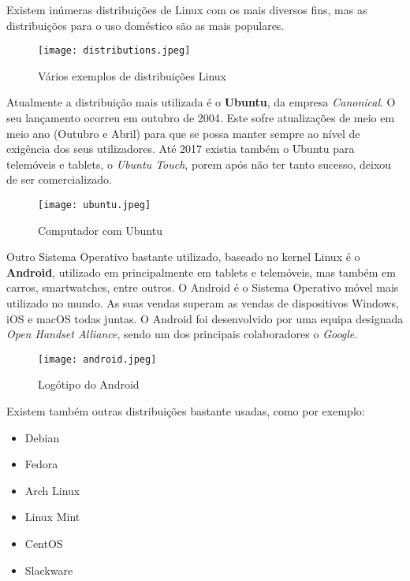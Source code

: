 \documentclass{report}
\begin{document}
\vspace{5mm}

Existem inúmeras distribuições de Linux com os mais diversos fins, mas as distribuições para o uso doméstico são as mais populares.

\begin{figure}[h!]
    \centering
    \texttt{[image: distributions.jpeg]}
    \caption{Vários exemplos de distribuições Linux}
\end{figure}

Atualmente a distribuição mais utilizada é o \textbf{Ubuntu}, da empresa \textit{Canonical}. O seu lançamento ocorreu em outubro de 2004. Este sofre atualizações de meio em meio ano (Outubro e Abril) para que se possa manter sempre ao nível de exigência dos seus utilizadores.
Até 2017 existia também o Ubuntu para telemóveis e tablets, o \textit{Ubuntu Touch}, porem após não ter tanto sucesso, deixou de ser comercializado. 

\begin{figure}[h!]
    \centering
    \texttt{[image: ubuntu.jpeg]}
    \caption{Computador com Ubuntu}
\end{figure}

Outro Sistema Operativo bastante utilizado, baseado no kernel Linux é o \textbf{Android}, utilizado em principalmente em tablets e telemóveis, mas também em carros, smartwatches, entre outros. O Android é o Sistema Operativo móvel mais utilizado no mundo. As suas vendas superam as vendas de dispositivos Windows, iOS e macOS todas juntas.
O Android foi desenvolvido por uma equipa designada \textit{Open Handset Alliance}, sendo um dos principais colaboradores o \textit{Google}.

\begin{figure}
    \centering
    \texttt{[image: android.jpeg]}
    \caption{Logótipo do Android}
\end{figure}

Existem também outras distribuições bastante usadas, como por exemplo: 

\begin{itemize}
    \item Debian
    \item Fedora 
    \item Arch Linux
    \item Linux Mint
    \item CentOS
    \item Slackware
\end{itemize}
\end{document}
